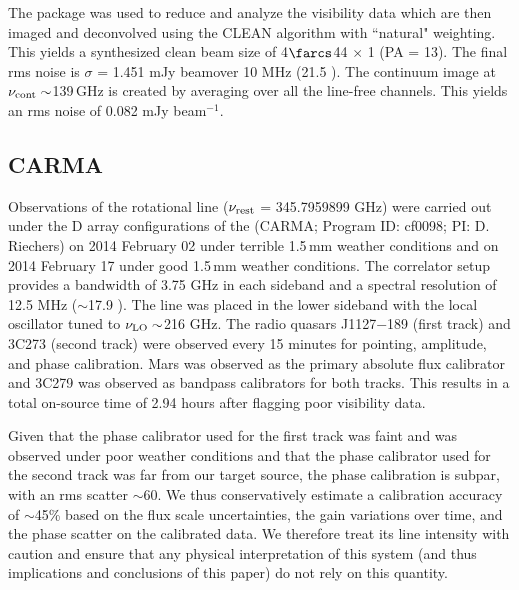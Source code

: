 \documentclass[]{emulateapj}
\begin{document}
The  package was used to reduce and analyze the visibility data
which are then imaged and deconvolved using the CLEAN algorithm with ``natural"
weighting. This yields a synthesized clean beam size of 4$\farcs$44 $\times$ 1 (PA = 13\degr).
The final rms noise is $\sigma$ = 1.451 mJy \kms
beam\pmOne over 10 MHz (21.5 \kms). The continuum image at $\nu_{\rm cont}\sim$139\,GHz
is created by averaging over all the line-free channels. This
yields an rms noise of 0.082 mJy beam$^{-1}$. %

\subsection{CARMA \cco} %
Observations of the \cco rotational line ($\nu_{\rm rest}$ = 345.7959899 GHz)
were carried out under the D array configurations of the \carma (CARMA;
Program ID: cf0098; PI: D. Riechers) on 2014 February 02 under terrible 1.5\,mm
weather conditions and on 2014 February 17 under good 1.5\,mm
weather conditions. The correlator setup provides a bandwidth of 3.75 GHz in
each sideband and a spectral resolution of 12.5 MHz ($\sim$17.9 \kms). The
line was placed in the lower sideband with the local oscillator tuned to $\nu_{\rm LO}\sim$216 GHz. The radio quasars J1127$-$189 (first track) and 3C273
(second track) were observed
every 15 minutes for pointing, amplitude, and phase calibration. Mars was
observed as the primary absolute flux calibrator and 3C279 was observed as
bandpass calibrators for both tracks. This results in a total on-source time of 2.94 hours after flagging poor
visibility data.

%
Given that the phase calibrator used for the first track was faint and was
observed under poor weather conditions and that the phase calibrator used for
the second track was far from our target source, the phase calibration is
subpar, with an rms scatter $\sim$60\degr. We thus conservatively estimate
a calibration accuracy of $\sim$45\% based on the flux scale uncertainties,
the gain variations over time, and the phase scatter on the calibrated data. We
therefore treat its line intensity with caution and ensure that any physical interpretation
of this system (and thus implications and conclusions of this paper) do not rely on this quantity.
\end{document}
